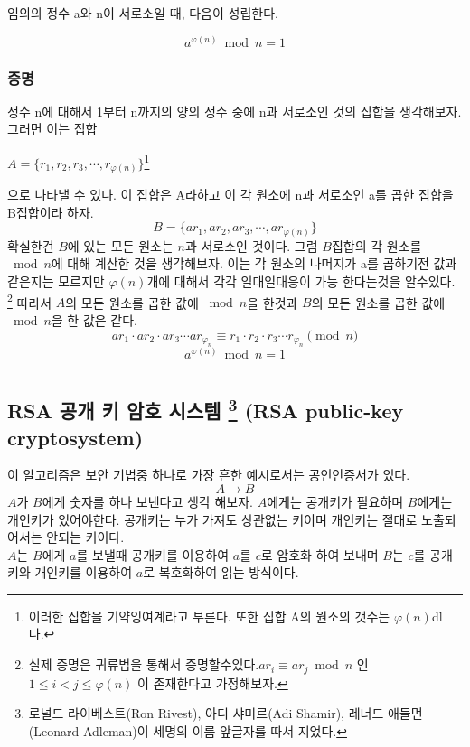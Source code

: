 \documentclass{oblivoir}
\begin{document}
\begin{justbox}
임의의 정수 a와 n이 서로소일 때, 다음이 성립한다.

\[a^{\varphi(n)} \bmod n = 1\]

\end{justbox}

\subsection{증명}
정수 n에 대해서 1부터 n까지의 양의 정수 중에 n과 서로소인 것의 집합을 생각해보자.
그러면 이는 집합
\begin{center}
    $A = \{ r_1 ,r_2,r_3, \cdots ,r_{\varphi(n)}\}$\footnote{이러한 집합을 기약잉여계라고 부른다. 또한 집합 A의 원소의 갯수는 $\varphi(n)$dl다.}
\end{center}
으로 나타낼 수 있다. 이 집합은 A라하고 이 각 원소에 n과 서로소인 a를 곱한 집합을 B집합이라 하자.
\[B = \{ ar_1 ,ar_2,ar_3, \cdots ,ar_{\varphi(n)}\} \]
확실한건 $B$에 있는 모든 원소는 $n$과 서로소인 것이다. 
그럼 $B$집합의 각 원소를 $\bmod n$에 대해 계산한 것을 생각해보자.
 이는 각 원소의 나머지가 a를 곱하기전 값과 같은지는 모르지만 $\varphi(n)$개에 대해서 각각 일대일대응이 가능 한다는것을 알수있다.
  \footnote{실제 증명은 귀류법을 통해서 증명할수있다.$ar_i  \equiv ar_j \bmod n $ 인 $1 \le i < j \le \varphi(n)$ 이 존재한다고 가정해보자.}
따라서 $A$의 모든 원소를 곱한 값에 $\bmod n$을 한것과 $B$의 모든 원소를 곱한 값에 $\bmod n$을 한 값은 같다.
\[ar_1 \cdot ar_2 \cdot ar_3 \cdots ar_{\varphi_{n}} \equiv r_1 \cdot r_2 \cdot r_3 \cdots r_{\varphi_{n}} \pmod n\]
\[a^{\varphi(n)}\bmod n= 1\]

\newpage

\chapter{}
\section{RSA 공개 키 암호 시스템 
\protect\footnote{로널드 라이베스트(Ron Rivest), 아디 샤미르(Adi Shamir), 레너드 애들먼(Leonard Adleman)이 세명의 이름 앞글자를 따서 지었다.}
(RSA public-key cryptosystem)}

이 알고리즘은 보안 기법중 하나로 가장 흔한 예시로서는 공인인증서가 있다.
    \[A \longrightarrow B\]
$A$가 $B$에게 숫자를 하나 보낸다고 생각 해보자. $A$에게는 공개키가 필요하며 $B$에게는 개인키가 있어야한다. 공개키는 누가 가져도 상관없는 키이며 개인키는 절대로 노출되어서는 안되는 키이다.\\
$A$는 $B$에게 $a$를 보낼때 공개키를 이용하여 $a$를 $c$로 암호화 하여 보내며 $B$는 $c$를 공개키와 개인키를 이용하여 $a$로 복호화하여 읽는 방식이다.
\end{document}
